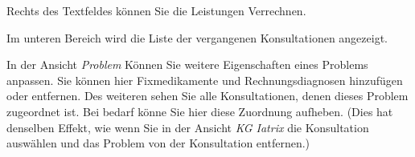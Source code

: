 Rechts des Textfeldes können Sie die Leistungen Verrechnen.

Im unteren Bereich wird die Liste der vergangenen Konsultationen angezeigt.

In der Ansicht \textit{Problem} Können Sie weitere Eigenschaften eines Problems
anpassen. Sie können hier Fixmedikamente und Rechnungsdiagnosen hinzufügen
oder entfernen. Des weiteren sehen Sie alle Konsultationen, denen dieses
Problem zugeordnet ist. Bei bedarf könne Sie hier diese Zuordnung aufheben.
(Dies hat denselben Effekt, wie wenn Sie in der Ansicht \textit{KG Iatrix}
die Konsultation auswählen und das Problem von der Konsultation entfernen.)

